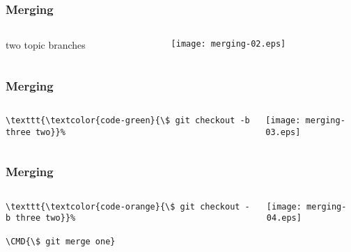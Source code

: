 \documentclass[english]{beamer}
\newcommand{\CMD}[1]{%
\texttt{\textcolor{code-green}{#1}}%
}
\newcommand{\cmd}[1]{%
\texttt{\textcolor{code-orange}{#1}}%
}
\begin{document}
\begin{frame}
\frametitle{Merging}

\begin{columns}[t]
        \begin{column}[T]{.5\textwidth}
                two topic branches
        \end{column}
        \begin{column}[T]{.5\textwidth}
                \texttt{[image: merging-02.eps]}
        \end{column}
\end{columns}
\end{frame}

\begin{frame}[fragile]
\frametitle{Merging}

\begin{columns}[t]
        \begin{column}[T]{.5\textwidth}
                {\small
                \begin{Verbatim}[commandchars=\\\{\}]
\CMD{\$ git checkout -b three two}
                \end{Verbatim}
                }
        \end{column}
        \begin{column}[T]{.5\textwidth}
                \texttt{[image: merging-03.eps]}
        \end{column}
\end{columns}
\end{frame}

\begin{frame}[fragile]
\frametitle{Merging}

\begin{columns}[t]
        \begin{column}[T]{.5\textwidth}
                {\small
                \begin{Verbatim}[commandchars=\\\{\}]
\cmd{\$ git checkout -b three two}
\CMD{\$ git merge one}
                \end{Verbatim}
                }
        \end{column}
        \begin{column}[T]{.5\textwidth}
                \texttt{[image: merging-04.eps]}
        \end{column}
\end{columns}
\end{frame}
\end{document}
